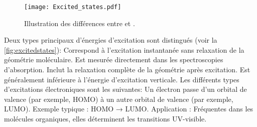 {}\begin{figure}[htpb]\markdownRendererSoftLineBreak
{}\centering\markdownRendererSoftLineBreak
{}\texttt{[image: Excited\_states.pdf]}\markdownRendererSoftLineBreak
{}\caption{Illustration des différences entre  et .}\markdownRendererSoftLineBreak
{}\label{fig:excitedstates}\markdownRendererSoftLineBreak
{}\end{figure}\markdownRendererParagraphSeparator
{}Deux types principaux d'énergies d'excitation sont distingués (voir la \autoref{fig:excitedstates}):\markdownRendererInterblockSeparator
{}\markdownRendererOlBegin
{}\markdownRendererInterblockSeparator
{}\markdownRendererUlBeginTight
\markdownRendererUlItem Correspond à l'excitation instantanée sans relaxation de la géométrie moléculaire.\markdownRendererUlItemEnd 
\markdownRendererUlItem Est mesurée directement dans les spectroscopies d'absorption.\markdownRendererUlItemEnd 
\markdownRendererUlEndTight \markdownRendererOlItemEnd 
{}\markdownRendererInterblockSeparator
{}\markdownRendererUlBeginTight
\markdownRendererUlItem Inclut la relaxation complète de la géométrie après excitation.\markdownRendererUlItemEnd 
\markdownRendererUlItem Est généralement inférieure à l'énergie d'excitation verticale.\markdownRendererUlItemEnd 
\markdownRendererUlEndTight \markdownRendererOlItemEnd 
\markdownRendererOlEnd \markdownRendererInterblockSeparator
{}Les différents types d'excitations électroniques sont les suivantes:\markdownRendererInterblockSeparator
{}\markdownRendererOlBegin
{}\markdownRendererInterblockSeparator
{}\markdownRendererUlBeginTight
\markdownRendererUlItem Un électron passe d'un orbital de valence (par exemple, HOMO) à un autre orbital de valence (par exemple, LUMO).\markdownRendererUlItemEnd 
\markdownRendererUlItem Exemple typique : HOMO → LUMO.\markdownRendererUlItemEnd 
\markdownRendererUlItem Application : Fréquentes dans les molécules organiques, elles déterminent les transitions UV-visible.\markdownRendererUlItemEnd 
\markdownRendererUlEndTight \markdownRendererOlItemEnd 
{}\markdownRendererInterblockSeparator
